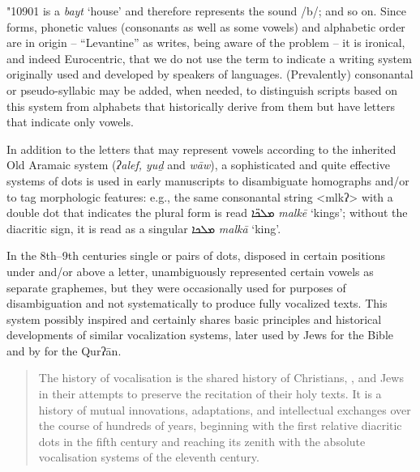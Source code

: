 \documentclass[output=paper,colorlinks,citecolor=brown,arabfont,syriacfont]{langscibook}
\begin{document}
{%
{\phoenicianfont\char"10901}
is a \textit{bayt} `house' and therefore represents the sound /b/; and so on. Since forms, phonetic values (consonants as well as some vowels) and alphabetic order are  in origin -- ``Levantine'' as \citet[729]{daniels1990} writes, being aware of the problem -- it is ironical, and indeed Eurocentric, that we do not use the term  to indicate a writing system originally used and developed by speakers of  languages. (Prevalently) consonantal or pseudo-syllabic may be added, when needed, to distinguish scripts based on this system from alphabets that historically derive from them but have letters that indicate only vowels.} 

In addition to the letters that may represent vowels according to the inherited Old Aramaic system (\textit{ʔalef, yuḏ} and \textit{wāw}), a sophisticated and quite effective systems of dots is used in early  manuscripts to disambiguate homographs and/or to tag morphologic features: e.g., the same consonantal string <mlkʔ> with a double dot that indicates the plural form is read \textsyriac{ܡܠܟ̈ܐ} \textit{malkē} `kings'; without the diacritic sign, it is read as a singular \textsyriac{ܡܠܟܐ} \textit{malkā} `king'.

In the 8th--9th centuries single or pairs of dots, disposed in certain positions under and/or above a letter, unambiguously represented certain vowels as separate graphemes, but they were occasionally used for purposes of disambiguation and not systematically to produce fully vocalized texts. This system possibly inspired and certainly shares basic principles and historical developments of similar vocalization systems, later used by Jews for the  Bible and by  for the Qurʔān. 

\begin{quote}
The history of  vocalisation is the shared history of Christians, , and Jews in their attempts to preserve the recitation of their holy texts. It is a history of mutual innovations, adaptations, and intellectual exchanges over the course of hundreds of years, beginning with the first  relative diacritic dots in the fifth century and reaching its zenith with the absolute vocalisation systems of the eleventh century. \citep[309]{posegay2021}
\end{quote}
\end{document}
